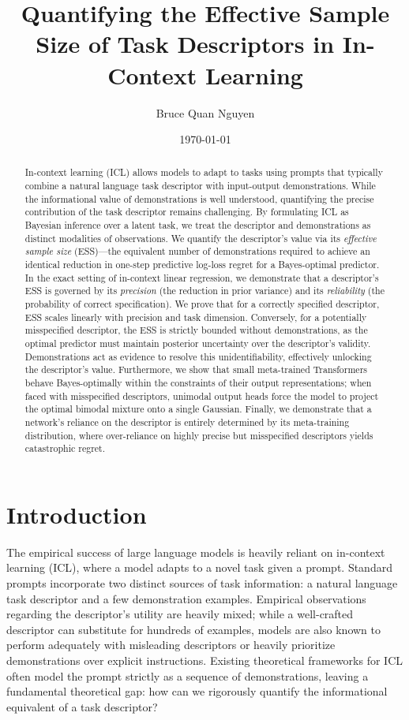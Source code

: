 \documentclass{article}
\title{Quantifying the Effective Sample Size of Task Descriptors in In-Context Learning}
\author{Bruce Quan Nguyen}
\date{\today}
\begin{document}
\maketitle

\begin{abstract}
In-context learning (ICL) allows models to adapt to tasks using prompts that typically combine a natural language task descriptor with input-output demonstrations. While the informational value of demonstrations is well understood, quantifying the precise contribution of the task descriptor remains challenging. By formulating ICL as Bayesian inference over a latent task, we treat the descriptor and demonstrations as distinct modalities of observations. We quantify the descriptor's value via its \emph{effective sample size} (ESS)---the equivalent number of demonstrations required to achieve an identical reduction in one-step predictive log-loss regret for a Bayes-optimal predictor. In the exact setting of in-context linear regression, we demonstrate that a descriptor's ESS is governed by its \emph{precision} (the reduction in prior variance) and its \emph{reliability} (the probability of correct specification). We prove that for a correctly specified descriptor, ESS scales linearly with precision and task dimension. Conversely, for a potentially misspecified descriptor, the ESS is strictly bounded without demonstrations, as the optimal predictor must maintain posterior uncertainty over the descriptor's validity. Demonstrations act as evidence to resolve this unidentifiability, effectively unlocking the descriptor's value. Furthermore, we show that small meta-trained Transformers behave Bayes-optimally within the constraints of their output representations; when faced with misspecified descriptors, unimodal output heads force the model to project the optimal bimodal mixture onto a single Gaussian. Finally, we demonstrate that a network's reliance on the descriptor is entirely determined by its meta-training distribution, where over-reliance on highly precise but misspecified descriptors yields catastrophic regret.
\end{abstract}

\section{Introduction}
The empirical success of large language models is heavily reliant on in-context learning (ICL), where a model adapts to a novel task given a prompt. Standard prompts incorporate two distinct sources of task information: a natural language task descriptor and a few demonstration examples. Empirical observations regarding the descriptor's utility are heavily mixed; while a well-crafted descriptor can substitute for hundreds of examples, models are also known to perform adequately with misleading descriptors or heavily prioritize demonstrations over explicit instructions. Existing theoretical frameworks for ICL often model the prompt strictly as a sequence of demonstrations, leaving a fundamental theoretical gap: how can we rigorously quantify the informational equivalent of a task descriptor?
\end{document}
